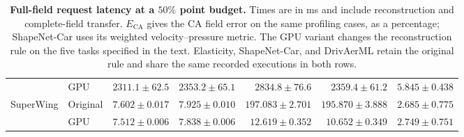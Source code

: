 \begin{table}[!ht]
\begin{tabular}{llrrrrr}
 & GPU & $2311.1\!\pm\!62.5$ & $2353.2\!\pm\!65.1$ & $2834.8\!\pm\!76.6$ & $2359.4\!\pm\!61.2$ & $5.845\!\pm\!0.438$ \\
\addlinespace[2pt]
SuperWing & Original & $7.602\!\pm\!0.017$ & $7.925\!\pm\!0.010$ & $197.083\!\pm\!2.701$ & $195.870\!\pm\!3.888$ & $2.685\!\pm\!0.775$ \\
 & GPU & $7.512\!\pm\!0.006$ & $7.838\!\pm\!0.006$ & $12.619\!\pm\!0.352$ & $10.652\!\pm\!0.349$ & $2.749\!\pm\!0.751$ \\
\bottomrule
\end{tabular}
\endgroup
\caption{\textbf{Full-field request latency at a $50\%$ point budget.}
Times are in ms and include reconstruction and complete-field transfer.
$E_{\mathrm{CA}}$ gives the CA field error on the same profiling cases, as a percentage;
ShapeNet-Car uses its weighted velocity--pressure metric.
The GPU variant changes the reconstruction rule on the five tasks specified in the text.
Elasticity, ShapeNet-Car, and DrivAerML retain the original rule and share the same recorded executions in both rows.}
\label{tab:inference_time_reconstruction}
\end{table}
